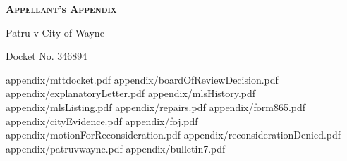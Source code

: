 \documentclass[12pt,\documentclassflag]{article}
\begin{document}

\begin{centering}
  \bf\scshape Appellant's Appendix\par%
  \rm Patru v City of Wayne\par%
  Docket No. 346894\par%
\end{centering}

\tableofcontents
\newpage
\renewcommand{\footrulewidth}{0.4pt}
\renewcommand{\subsectionmark}[1]{\markright{/#1}} %

\newcommand{\addLabelsToAllIncludedPages}[1]{%
   \refstepcounter{includepdfpage}%
   \stepcounter{currentpagecounter}%
   \label{#1.\thecurrentpagecounter}}%

\newcommand{\myincludepdf}[2]{%
  \setcounter{currentpagecounter}{0}%
  {appendix/#1.pdf}}%
  
\renewcommand{\sectionmark}[1]{\markboth{#1}{}} %
\myincludepdf{mttdocket}{1,section, 1, Tax Tribunal Docket}
\myincludepdf{boardOfReviewDecision}{1,section,1,Board of Review Decision}%
\renewcommand{\sectionmark}[1]{\markboth{#1}{/Explanatory Letter}} %
\myincludepdf{explanatoryLetter}{1,section,1,Appellant's Evidence,evidence,1,subsection,2,Explanatory Letter}%
\myincludepdf{mlsHistory}{1,subsection,2,MLS History}%
\myincludepdf{mlsListing}{1,subsection,2,MLS Listing Sheet}%
\myincludepdf{repairs}{1,subsection,2,List of Repairs}%
\myincludepdf{form865}{1,subsection,2,Form 865 Mathieu Gast Nonconsideration}%
\renewcommand{\sectionmark}[1]{\markboth{#1}{}} %
\myincludepdf{cityEvidence}{1,section,1,City's Evidence}%
\myincludepdf{foj}{1,section,1,Final Opinion and Judgement}%
\myincludepdf{motionForReconsideration}{1,section,1,Motion For Reconsideration}%
\myincludepdf{reconsiderationDenied}{1,section,1,Reconsideration Denied} %
\myincludepdf{patruvwayne}{1,section,1,Patru v Wayne}
\myincludepdf{bulletin7}{1,section,1,STC Bulletin 7 of 2014 (Mathieu Gast Act)}%

\newpage\empty%
\end{document}
